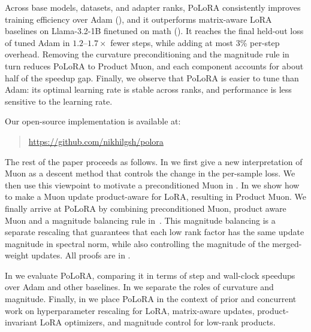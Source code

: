 \documentclass[11pt]{article}
\newcommand{\mat}[1]{\bm{#1}}
\newcommand{\norm}[1]{\| #1\|}
\newcommand{\methodname}{PoLoRA\xspace}
\begin{document}
Across base models, datasets, and adapter ranks, \methodname{} consistently improves training efficiency over Adam (), and it outperforms matrix-aware LoRA baselines on Llama-3.2-1B finetuned on math (). It reaches the final held-out loss of tuned Adam in $1.2$--$1.7\times$ fewer steps, while adding at most 3\% per-step overhead. Removing the curvature preconditioning and the magnitude rule in turn reduces \methodname{} to Product Muon, and each component accounts for about half of the speedup gap. Finally, we observe that \methodname{} is easier to tune than Adam: its optimal learning rate is stable across ranks, and performance is less sensitive to the learning rate.

Our open-source implementation is available at:
\begin{quote}\centering
\url{https://github.com/nikhilgsh/polora}
\end{quote}

The rest of the paper proceeds as follows. In  we
first give a new interpretation of Muon as a descent method that controls the change in the per-sample loss.
We then use this viewpoint to motivate a preconditioned Muon in . In  we show how to make a Muon update product-aware for LoRA, resulting in Product Muon. 
We finally arrive at \methodname{} by combining preconditioned Muon, product aware Muon and a magnitude balancing rule in~. This magnitude balancing is a separate rescaling that guarantees that each low rank factor has the same update magnitude in spectral norm, while also controlling the magnitude of the merged-weight updates. All proofs are in .


In  we evaluate \methodname{}, comparing it in terms of step and wall-clock speedups over Adam and other baselines.
In  we separate the roles of curvature and magnitude.
Finally, in  we place \methodname{} in the context of prior and concurrent work on hyperparameter rescaling for LoRA, matrix-aware updates, product-invariant LoRA optimizers, and magnitude control for low-rank products. 


\end{document}
